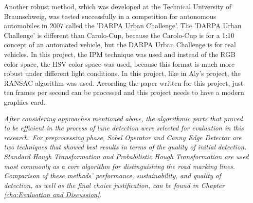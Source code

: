Another robust method\cite{A_Fast_and_Robust_Approach}, which was developed at the Technical University of Braunschweig, was tested successfully in a competition for autonomous automobiles in 2007 called the 'DARPA Urban Challenge'. The 'DARPA Urban Challenge' is different than Carolo-Cup, because the Carolo-Cup is for a 1:10 concept of an automated vehicle, but the DARPA Urban Challenge is for real vehicles. In this project, the IPM technique was used and instead of the RGB color space, the HSV color space was used, because this format is much more robust under different light conditions. In this project, like in Aly's project, the RANSAC algorithm was used. According the paper written for this project, just ten frames per second can be processed and this project needs to have a modern graphics card.

\emph{\color{blue} After considering approaches mentioned above, the algorithmic parts that proved to be efficient in the process of lane detection were selected for evaluation in this research. For preprocessing phase, Sobel Operator and Canny Edge Detector are two techniques that showed best results in terms of the quality of initial detection. Standard Hough Transformation and Probabilistic Hough Transformation are used most commonly as a core algorithm for distinguishing the road marking lines. Comparison of these methods' performance, sustainability, and quality of detection, as well as the final choice justification, can be found in Chapter \ref{cha:Evaluation and Discussion}. }


